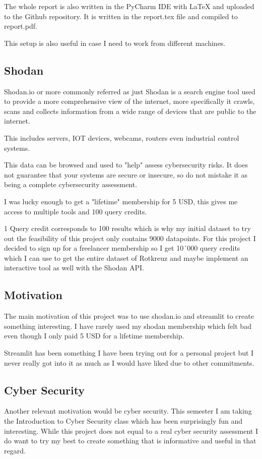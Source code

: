 \documentclass[11pt,a4paper]{article}
\begin{document}
\begin{about}
The whole report is also written in the PyCharm IDE with LaTeX and uploaded to the Github repository. It is written in the
report.tex file and compiled to report.pdf.

This setup is also useful in case I need to work from different machines.

\subsection{Shodan}

Shodan.io or more commonly referred as just Shodan is a search engine tool used to provide a more comprehensive view of
the internet, more specifically it crawls, scans and collects information from a wide range of devices that are public to
the internet.

This includes servers, IOT devices, webcams, routers even industrial control systems.

This data can be browsed and used to "help" assess cybersecurity risks. It does not guarantee that your systems are secure or insecure,
so do not mistake it as being a complete cybersecurity assessment.

I was lucky enough to get a "lifetime" membership for 5 USD, this gives me access to multiple tools and 100 query credits.

1 Query credit corresponds to 100 results which is why my initial dataset to try out the feasibility of this project only
contains 9000 datapoints. For this project I decided to sign up for a freelancer membership so I get 10´000 query credits
which I can use to get the entire dataset of Rotkreuz and maybe implement an interactive tool as well with the Shodan API.

\end{about}
\newpage

\begin{motivation}
\section{Motivation}
The main motivation of this project was to use shodan.io and streamlit to create something interesting. I have rarely used
my shodan membership which felt bad even though I only paid 5 USD for a lifetime membership.

Streamlit has been something I have been trying out for a personal project but I never really got into it as much as I
would have liked due to other commitments.

\subsection{Cyber Security}
Another relevant motivation would be cyber security. This semester I am taking the Introduction to Cyber Security class
which has been surprisingly fun and interesting. While this project does not equal to a real cyber security assessment I
do want to try my best to create something that is informative and useful in that regard.

\end{motivation}
\newpage
\end{document}
